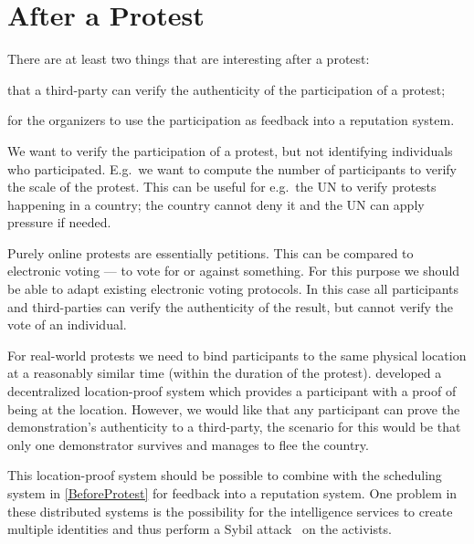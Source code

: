 \section{After a Protest}
\label{AfterProtest}

There are at least two things that are interesting after a protest:
\begin{inparaenum}[(a)]
\item that a third-party can verify the authenticity of the participation of 
  a protest;
\item for the organizers to use the participation as feedback into a reputation 
  system.
\end{inparaenum}
We want to verify the participation of a protest, but not identifying 
individuals who participated.
E.g.\ we want to compute the number of participants to verify the scale of the 
protest.
This can be useful for e.g.\ the UN to verify protests happening in a country; 
the country cannot deny it and the UN can apply pressure if needed.

Purely online protests are essentially petitions.
This can be compared to electronic voting --- to vote for or against something.
For this purpose we should be able to adapt existing electronic voting 
protocols.
In this case all participants and third-parties can verify the authenticity of 
the result, but cannot verify the vote of an individual.

For real-world protests we need to bind participants to the same physical 
location at a reasonably similar time (within the duration of the protest).
\citet{PROPS} developed a decentralized location-proof system which provides 
a participant with a proof of being at the location.
However, we would like that any participant can prove the demonstration's 
authenticity to a third-party, the scenario for this would be that only one 
demonstrator survives and manages to flee the country.

This location-proof system should be possible to combine with the scheduling 
system in \cref{BeforeProtest} for feedback into a reputation system.
One problem in these distributed systems is the possibility for the 
intelligence services to create multiple identities and thus perform a Sybil 
attack~\cite{SybilAttack} on the activists.

